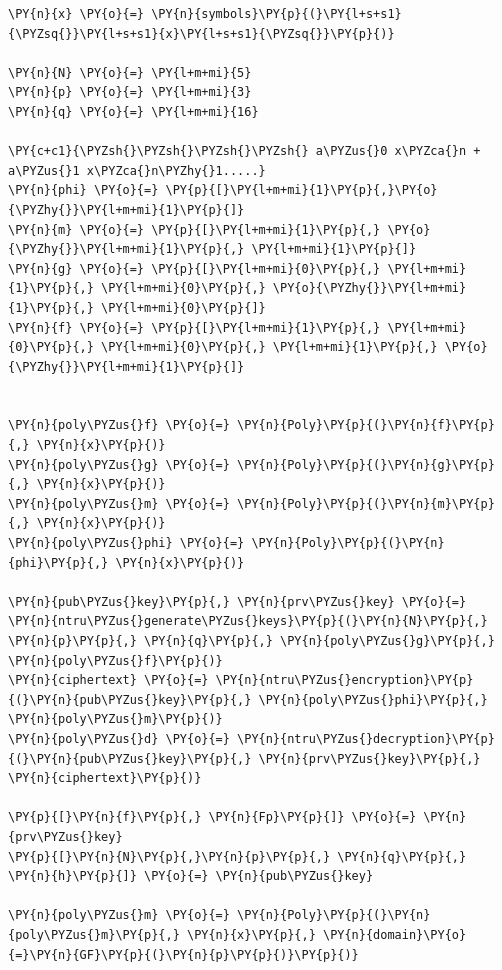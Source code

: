 \documentclass[a4paper,12pt]{article}
\begin{document}
    \begin{tcolorbox}[breakable, size=fbox, boxrule=1pt, pad at break*=1mm,colback=cellbackground, colframe=cellborder]
\begin{Verbatim}[commandchars=\\\{\}]
\PY{n}{x} \PY{o}{=} \PY{n}{symbols}\PY{p}{(}\PY{l+s+s1}{\PYZsq{}}\PY{l+s+s1}{x}\PY{l+s+s1}{\PYZsq{}}\PY{p}{)}

\PY{n}{N} \PY{o}{=} \PY{l+m+mi}{5}
\PY{n}{p} \PY{o}{=} \PY{l+m+mi}{3}
\PY{n}{q} \PY{o}{=} \PY{l+m+mi}{16}

\PY{c+c1}{\PYZsh{}\PYZsh{}\PYZsh{}\PYZsh{} a\PYZus{}0 x\PYZca{}n + a\PYZus{}1 x\PYZca{}n\PYZhy{}1.....}
\PY{n}{phi} \PY{o}{=} \PY{p}{[}\PY{l+m+mi}{1}\PY{p}{,}\PY{o}{\PYZhy{}}\PY{l+m+mi}{1}\PY{p}{]}
\PY{n}{m} \PY{o}{=} \PY{p}{[}\PY{l+m+mi}{1}\PY{p}{,} \PY{o}{\PYZhy{}}\PY{l+m+mi}{1}\PY{p}{,} \PY{l+m+mi}{1}\PY{p}{]}
\PY{n}{g} \PY{o}{=} \PY{p}{[}\PY{l+m+mi}{0}\PY{p}{,} \PY{l+m+mi}{1}\PY{p}{,} \PY{l+m+mi}{0}\PY{p}{,} \PY{o}{\PYZhy{}}\PY{l+m+mi}{1}\PY{p}{,} \PY{l+m+mi}{0}\PY{p}{]}
\PY{n}{f} \PY{o}{=} \PY{p}{[}\PY{l+m+mi}{1}\PY{p}{,} \PY{l+m+mi}{0}\PY{p}{,} \PY{l+m+mi}{0}\PY{p}{,} \PY{l+m+mi}{1}\PY{p}{,} \PY{o}{\PYZhy{}}\PY{l+m+mi}{1}\PY{p}{]}


\PY{n}{poly\PYZus{}f} \PY{o}{=} \PY{n}{Poly}\PY{p}{(}\PY{n}{f}\PY{p}{,} \PY{n}{x}\PY{p}{)}
\PY{n}{poly\PYZus{}g} \PY{o}{=} \PY{n}{Poly}\PY{p}{(}\PY{n}{g}\PY{p}{,} \PY{n}{x}\PY{p}{)}
\PY{n}{poly\PYZus{}m} \PY{o}{=} \PY{n}{Poly}\PY{p}{(}\PY{n}{m}\PY{p}{,} \PY{n}{x}\PY{p}{)}
\PY{n}{poly\PYZus{}phi} \PY{o}{=} \PY{n}{Poly}\PY{p}{(}\PY{n}{phi}\PY{p}{,} \PY{n}{x}\PY{p}{)}

\PY{n}{pub\PYZus{}key}\PY{p}{,} \PY{n}{prv\PYZus{}key} \PY{o}{=} \PY{n}{ntru\PYZus{}generate\PYZus{}keys}\PY{p}{(}\PY{n}{N}\PY{p}{,} \PY{n}{p}\PY{p}{,} \PY{n}{q}\PY{p}{,} \PY{n}{poly\PYZus{}g}\PY{p}{,} \PY{n}{poly\PYZus{}f}\PY{p}{)}
\PY{n}{ciphertext} \PY{o}{=} \PY{n}{ntru\PYZus{}encryption}\PY{p}{(}\PY{n}{pub\PYZus{}key}\PY{p}{,} \PY{n}{poly\PYZus{}phi}\PY{p}{,} \PY{n}{poly\PYZus{}m}\PY{p}{)}
\PY{n}{poly\PYZus{}d} \PY{o}{=} \PY{n}{ntru\PYZus{}decryption}\PY{p}{(}\PY{n}{pub\PYZus{}key}\PY{p}{,} \PY{n}{prv\PYZus{}key}\PY{p}{,} \PY{n}{ciphertext}\PY{p}{)}

\PY{p}{[}\PY{n}{f}\PY{p}{,} \PY{n}{Fp}\PY{p}{]} \PY{o}{=} \PY{n}{prv\PYZus{}key}
\PY{p}{[}\PY{n}{N}\PY{p}{,}\PY{n}{p}\PY{p}{,} \PY{n}{q}\PY{p}{,} \PY{n}{h}\PY{p}{]} \PY{o}{=} \PY{n}{pub\PYZus{}key}

\PY{n}{poly\PYZus{}m} \PY{o}{=} \PY{n}{Poly}\PY{p}{(}\PY{n}{poly\PYZus{}m}\PY{p}{,} \PY{n}{x}\PY{p}{,} \PY{n}{domain}\PY{o}{=}\PY{n}{GF}\PY{p}{(}\PY{n}{p}\PY{p}{)}\PY{p}{)}


\end{Verbatim}
\end{tcolorbox}
\end{document}
